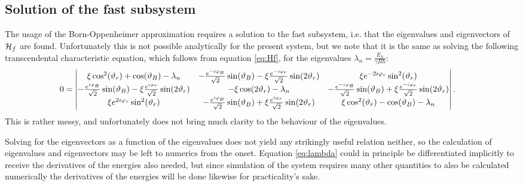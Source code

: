 \documentclass[a4paper]{article}
\begin{document}
\subsection{Solution of the fast subsystem} 
The usage of the Born-Oppenheimer approximation requires a solution to the fast subsystem,
i.e. that the eigenvalues and eigenvectors of \(\mathbb{\cal H}_f\) are found.
Unfortunately this is not possible analytically for the present system, but we note that it
is the same as solving the following transcendental characteristic equation, which follows
from equation \ref{eq:Hf}, for the
eigenvalues \(\lambda_n = \frac{E_n}{\gamma B\hbar{}}\): %
\begin{align}\label{eq:lambda}
        0 &= \mdet{
                 \xi\cos[2](\vartheta_r) + \cos(\vartheta_B) - \lambda_n& -\frac{
                        e^{-i\varphi_B}}{\sqrt{2}
                }\sin(\vartheta_B) - \xi\frac{e^{-i\varphi_r}}{\sqrt{2} }\sin(2\vartheta_r) &
                \xi e^{-2i\varphi_r}\sin[2](\vartheta_r)\\
                 -\frac{e^{i\varphi_B}}{\sqrt{2}}\sin(\vartheta_B) -
                \xi \frac{e^{i\varphi_r}}{\sqrt{2} }\sin(2\vartheta_r) &
                -\xi\cos(2\vartheta_r) - \lambda_n & -\frac{
                e^{-i\varphi_B}}{\sqrt{2} }\sin(\vartheta_B)+ \xi\frac{e^{-i\varphi_r}}{\sqrt{2}
        }\sin(2\vartheta_r)\\
                \xi e^{2i\varphi_r}\sin[2](\vartheta_r) & -\frac{
                e^{i\varphi_B}}{\sqrt{2} }\sin(\vartheta_B) +
                        \xi \frac{e^{i\varphi_r}}{\sqrt{2} }\sin(2\vartheta_r) &
                        \xi \cos[2](\vartheta_r) - \cos(\vartheta_B) - \lambda_n 
        }
.\end{align}
This is rather messy, and unfortunately does not bring much clarity to the behaviour of the
eigenvalues. 

Solving for the eigenvectors as a function of the eigenvalues does not yield any strikingly
useful relation neither, so the calculation of eigenvalues and eigenvectors may be left to numerics from
the onset. Equation \ref{eq:lambda} could in principle be differentiated implicitly to
receive the derivatives of the energies also needed, but since simulation of the system requires many other quantities 
to also be calculated numerically the derivatives of the energies will be done likewise for
practicality's sake.
\end{document}
